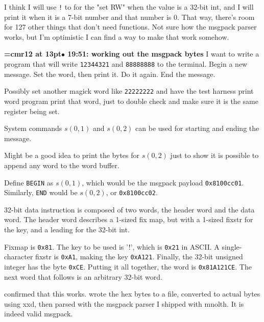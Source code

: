 I think I will use {\tt !} to for the "set RW" when the value is a 32-bit int, and I will print it when it is a 7-bit number and that number is 0. That way, there's room for 127 other things that don't need functions. Not sure how the msgpack parser works, but I'm optimistic I can find a way to make that work somehow.
\par

{\smallskip\noindent\bf\font\titlefont=cmr12 at 13pt\titlefont $\bullet$ 19:51: working out the msgpack bytes}\smallskip
I want to write a program that will write {\tt 12344321} and {\tt 88888888} to the terminal. Begin a new message. Set the word, then print it. Do it again. End the message.
\par

Possibly set another magick word like {\tt 22222222} and have the test harness print word program print that word, just to double check and make sure it is the same register being set.
\par

System commands $s(0, 1)$ and $s(0, 2)$ can be used for starting and ending the message.
\par

Might be a good idea to print the bytes for $s(0, 2)$ just to show it is possible to append any word to the word buffer.
\par

Define {\tt BEGIN} as $s(0,1)$, which would be the msgpack payload {\tt 0x8100cc01}. Similarly, {\tt END} would be $s(0,2)$, or {\tt 0x8100cc02}.
\par

32-bit data instruction is composed of two words, the header word and the data word. The header word describes a 1-sized fix map, but with a 1-sized fixstr for the key, and a leading for the 32-bit int.
\par

Fixmap is {\tt 0x81}. The key to be used is '!', which is {\tt 0x21} in ASCII. A single-character fixstr is {\tt 0xA1}, making the key {\tt 0xA121}. Finally, the 32-bit unsigned integer has the byte {\tt 0xCE}. Putting it all together, the word is {\tt 0x81A121CE}. The next word that follows is an arbitrary 32-bit word.
\par

confirmed that this works. wrote the hex bytes to a file, converted to actual bytes using xxd, then parsed with the msgpack parser I shipped with mnolth. It is indeed valid msgpack.
\par

